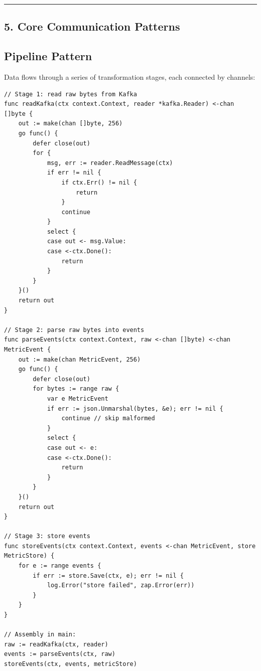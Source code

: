 \documentclass[11pt,a4paper,oneside]{book}
\begin{document}
\begin{center}\rule{0.5\linewidth}{0.5pt}\end{center}

\subsection{5. Core Communication
Patterns}

\subsection{Pipeline Pattern}

Data flows through a series of transformation stages, each connected by
channels:

\begin{verbatim}
// Stage 1: read raw bytes from Kafka
func readKafka(ctx context.Context, reader *kafka.Reader) <-chan []byte {
    out := make(chan []byte, 256)
    go func() {
        defer close(out)
        for {
            msg, err := reader.ReadMessage(ctx)
            if err != nil {
                if ctx.Err() != nil {
                    return
                }
                continue
            }
            select {
            case out <- msg.Value:
            case <-ctx.Done():
                return
            }
        }
    }()
    return out
}

// Stage 2: parse raw bytes into events
func parseEvents(ctx context.Context, raw <-chan []byte) <-chan MetricEvent {
    out := make(chan MetricEvent, 256)
    go func() {
        defer close(out)
        for bytes := range raw {
            var e MetricEvent
            if err := json.Unmarshal(bytes, &e); err != nil {
                continue // skip malformed
            }
            select {
            case out <- e:
            case <-ctx.Done():
                return
            }
        }
    }()
    return out
}

// Stage 3: store events
func storeEvents(ctx context.Context, events <-chan MetricEvent, store MetricStore) {
    for e := range events {
        if err := store.Save(ctx, e); err != nil {
            log.Error("store failed", zap.Error(err))
        }
    }
}

// Assembly in main:
raw := readKafka(ctx, reader)
events := parseEvents(ctx, raw)
storeEvents(ctx, events, metricStore)
\end{verbatim}
\end{document}

